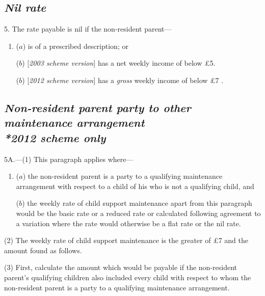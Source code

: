 \documentclass[12pt,a4paper]{article}
\begin{document}

\subsection*{\itshape Nil rate}

5. The rate payable is nil if the non-resident parent—
\begin{enumerate}\item[]
($a$) is of a prescribed description; or

($b$) [\emph{2003 scheme version}] has a net weekly income of below £5.
 
($b$) [\emph{2012 scheme version}] has a 
\emph{gross}  %
weekly income of below 
£7%
. 
\end{enumerate}


\subsection*{\itshape Non-resident parent party to other maintenance arrangement\\*\emph{2012 scheme only}}

5A.---(1) This paragraph applies where—
\begin{enumerate}\item[]
($a$) the non-resident parent is a party to a qualifying maintenance arrangement with respect to a child of his who is not a qualifying child, and

($b$) the weekly rate of child support maintenance apart from this paragraph would be the basic rate or a reduced rate or calculated following agreement to a variation where the rate would otherwise be a flat rate or the nil rate.
\end{enumerate}

(2) The weekly rate of child support maintenance is the greater of 
£7   %
and the amount found as follows.

(3) First, calculate the amount which would be payable if the non-resident parent's qualifying children also included every child with respect to whom the non-resident parent is a party to a qualifying maintenance arrangement.
\end{document}
